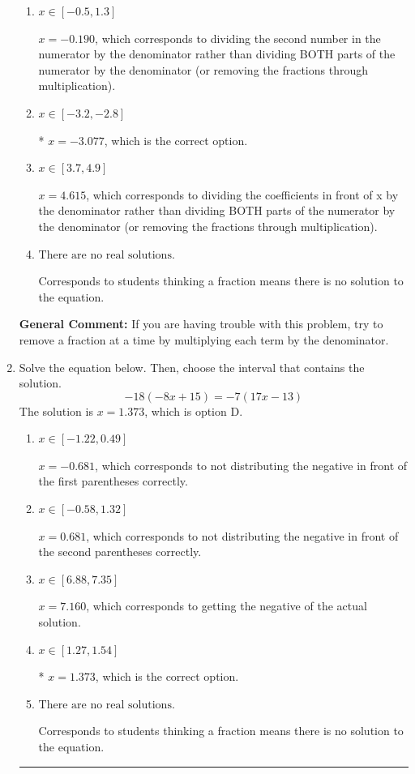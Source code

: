 \documentclass{extbook}[14pt]
\newcommand{\litem}[1]{\item #1

\rule{\textwidth}{0.4pt}}
\begin{document}
\begin{enumerate}
{\begin{enumerate}[label=\Alph*.]
 $x = -7.692$, which corresponds to not distributing the negative in front of the second fraction.
\item \( x \in [-0.5, 1.3] \)

 $x = -0.190$, which corresponds to dividing the second number in the numerator by the denominator rather than dividing BOTH parts of the numerator by the denominator (or removing the fractions through multiplication).
\item \( x \in [-3.2, -2.8] \)

* $x = -3.077$, which is the correct option.
\item \( x \in [3.7, 4.9] \)

 $x = 4.615$, which corresponds to dividing the coefficients in front of x by the denominator rather than dividing BOTH parts of the numerator by the denominator (or removing the fractions through multiplication).
\item \( \text{There are no real solutions.} \)

Corresponds to students thinking a fraction means there is no solution to the equation.
\end{enumerate}

\textbf{General Comment:} If you are having trouble with this problem, try to remove a fraction at a time by multiplying each term by the denominator.
}
\litem{
Solve the equation below. Then, choose the interval that contains the solution.
\[ -18(-8x + 15) = -7(17x -13) \]The solution is \( x = 1.373 \), which is option D.\begin{enumerate}[label=\Alph*.]
\item \( x \in [-1.22, 0.49] \)

$x = -0.681$, which corresponds to not distributing the negative in front of the first parentheses correctly.
\item \( x \in [-0.58, 1.32] \)

$x = 0.681$, which corresponds to not distributing the negative in front of the second parentheses correctly.
\item \( x \in [6.88, 7.35] \)

$x = 7.160$, which corresponds to getting the negative of the actual solution.
\item \( x \in [1.27, 1.54] \)

* $x = 1.373$, which is the correct option.
\item \( \text{There are no real solutions.} \)

Corresponds to students thinking a fraction means there is no solution to the equation.
\end{enumerate}

}
\end{enumerate}
\end{document}
